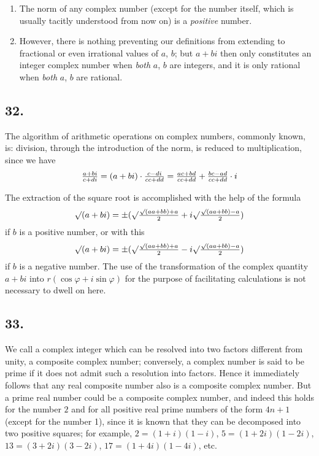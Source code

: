 \documentclass[twoside,12pt, showframe]{memoir}
\let\oldfrac\frac
\def\frac#1#2{\mathchoice{\tfrac{#1}{#2}}{\oldfrac{#1}{#2}}{\genfrac{}{}{}{2}{#1}{#2\mathstrut}}{\genfrac{}{}{}{3}{#1}{#2\mathstrut}}}
\begin{document}
\begin{enumerate}
  \item The norm of any complex number (except for the number itself, which is usually tacitly understood from now on) is a \textit{positive} number.
  
  \item However, there is nothing preventing our definitions from extending to fractional or even irrational values of \(a\), \(b\); but \(a+bi\) then only constitutes an integer complex number when \textit{both} \(a\), \(b\) are integers, and it is only rational when \textit{both} \(a\), \(b\) are rational.
\end{enumerate}
%

\subsection*{32.}
 
The algorithm of arithmetic operations on complex numbers, commonly known, is: division, through the introduction of the norm, is reduced to multiplication, since we have
\[\frac{a+b i}{c+d i}=(a+b i) \cdot \frac{c-d i}{c c+d d}=\frac{a c+b d}{c c+d d}+\frac{b c-a d}{c c+d d} \cdot i\]
 
The extraction of the square root is accomplished with the help of the formula
\[\surd(a+b i)= \pm(\surd \frac{\surd(a a+b b)+a}{2}+i \surd \frac{\surd(a a+b b)-a}{2})\]
if \(b\) is a positive number, or with this
\[\surd(a+b i)= \pm(\surd \frac{\surd(a a+b b)+a}{2}-i \surd \frac{\surd(a a+b b)-a}{2})\]
if \(b\) is a negative number. The use of the transformation of the complex quantity \(a+b i\) into \(r(\cos \varphi+i \sin \varphi)\) for the purpose of facilitating calculations is not necessary to dwell on here.
%

\subsection*{33.}

We call a complex integer which can be resolved into two factors different from unity, a composite complex number; conversely, a complex number is said to be prime if it does not admit such a resolution into factors. Hence it immediately follows that any real composite number also is a composite complex number. But a prime real number could be a composite complex number, and indeed this holds for the number \(2\) and for all positive real prime numbers of the form \(4n+1\) (except for the number 1), since it is known that they can be decomposed into two positive squares; for example, \(2=(1+i)(1-i)\), \(5=(1+2i)(1-2i)\), \(13=(3+2i)(3-2i)\), \(17=(1+4i)(1-4i)\), etc.
\end{document}
